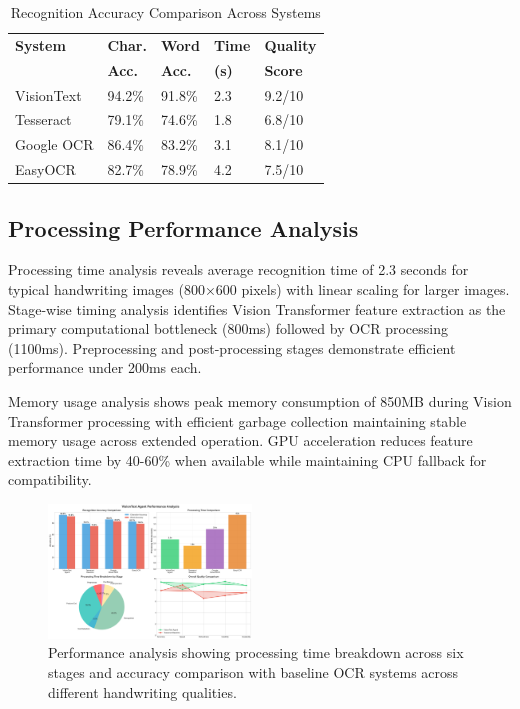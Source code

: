 \documentclass[10pt,twocolumn]{article}
\begin{document}
\begin{table}[!htb]
\centering
\caption{Recognition Accuracy Comparison Across Systems}
\footnotesize
\begin{tabular}{p{1.6cm}p{0.8cm}p{0.8cm}p{0.8cm}p{0.7cm}}
\toprule
\textbf{System} & \textbf{Char.} & \textbf{Word} & \textbf{Time} & \textbf{Quality} \\
 & \textbf{Acc.} & \textbf{Acc.} & \textbf{(s)} & \textbf{Score} \\
\midrule
VisionText & 94.2\% & 91.8\% & 2.3 & 9.2/10 \\
Tesseract & 79.1\% & 74.6\% & 1.8 & 6.8/10 \\
Google OCR & 86.4\% & 83.2\% & 3.1 & 8.1/10 \\
EasyOCR & 82.7\% & 78.9\% & 4.2 & 7.5/10 \\
\bottomrule
\end{tabular}
\label{tab:comparison}
\end{table}

\subsection{Processing Performance Analysis}

Processing time analysis reveals average recognition time of 2.3 seconds for typical handwriting images (800×600 pixels) with linear scaling for larger images. Stage-wise timing analysis identifies Vision Transformer feature extraction as the primary computational bottleneck (800ms) followed by OCR processing (1100ms). Preprocessing and post-processing stages demonstrate efficient performance under 200ms each.

Memory usage analysis shows peak memory consumption of 850MB during Vision Transformer processing with efficient garbage collection maintaining stable memory usage across extended operation. GPU acceleration reduces feature extraction time by 40-60\% when available while maintaining CPU fallback for compatibility.

\begin{figure}[!htb]
\centering
\includegraphics[width=0.48\textwidth]{performance_analysis.png}
\caption{Performance analysis showing processing time breakdown across six stages and accuracy comparison with baseline OCR systems across different handwriting qualities.}
\label{fig:performance}
\end{figure}
\end{document}
